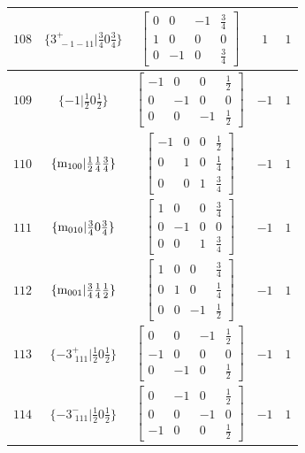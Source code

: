 \documentclass[fleqn,8pt]{jsarticle}
\begin{document}
\begin{longtable}{ccccc}
$ 108 $ & $ \{3^{+}_{\,\,-1-11}|\frac{3}{4} 0 \frac{3}{4}\} $ & $ \begin{bmatrix} 0 & 0 & -1 & \frac{3}{4} \\ 1 & 0 & 0 & 0 \\ 0 & -1 & 0 & \frac{3}{4} \end{bmatrix} $ & $ 1 $ & $ 1 $ \\ \hline
$ 109 $ & $ \{-1|\frac{1}{2} 0 \frac{1}{2}\} $ & $ \begin{bmatrix} -1 & 0 & 0 & \frac{1}{2} \\ 0 & -1 & 0 & 0 \\ 0 & 0 & -1 & \frac{1}{2} \end{bmatrix} $ & $ -1 $ & $ 1 $ \\ \hline
$ 110 $ & $ \{{\rm m}_{100}|\frac{1}{2} \frac{1}{4} \frac{3}{4}\} $ & $ \begin{bmatrix} -1 & 0 & 0 & \frac{1}{2} \\ 0 & 1 & 0 & \frac{1}{4} \\ 0 & 0 & 1 & \frac{3}{4} \end{bmatrix} $ & $ -1 $ & $ 1 $ \\ \hline
$ 111 $ & $ \{{\rm m}_{010}|\frac{3}{4} 0 \frac{3}{4}\} $ & $ \begin{bmatrix} 1 & 0 & 0 & \frac{3}{4} \\ 0 & -1 & 0 & 0 \\ 0 & 0 & 1 & \frac{3}{4} \end{bmatrix} $ & $ -1 $ & $ 1 $ \\ \hline
$ 112 $ & $ \{{\rm m}_{001}|\frac{3}{4} \frac{1}{4} \frac{1}{2}\} $ & $ \begin{bmatrix} 1 & 0 & 0 & \frac{3}{4} \\ 0 & 1 & 0 & \frac{1}{4} \\ 0 & 0 & -1 & \frac{1}{2} \end{bmatrix} $ & $ -1 $ & $ 1 $ \\ \hline
$ 113 $ & $ \{-3^{+}_{\,\,111}|\frac{1}{2} 0 \frac{1}{2}\} $ & $ \begin{bmatrix} 0 & 0 & -1 & \frac{1}{2} \\ -1 & 0 & 0 & 0 \\ 0 & -1 & 0 & \frac{1}{2} \end{bmatrix} $ & $ -1 $ & $ 1 $ \\ \hline
$ 114 $ & $ \{-3^{-}_{\,\,111}|\frac{1}{2} 0 \frac{1}{2}\} $ & $ \begin{bmatrix} 0 & -1 & 0 & \frac{1}{2} \\ 0 & 0 & -1 & 0 \\ -1 & 0 & 0 & \frac{1}{2} \end{bmatrix} $ & $ -1 $ & $ 1 $ \\ \hline

\end{longtable}
\end{document}
